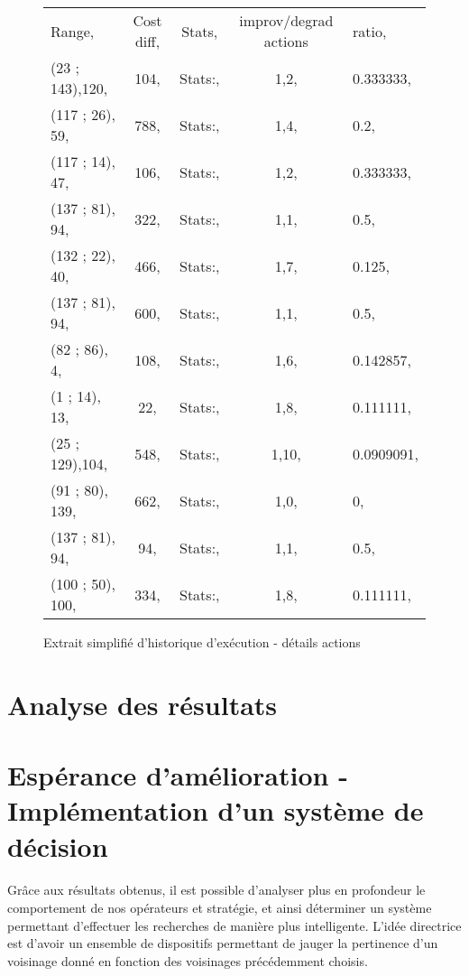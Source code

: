 \documentclass[a4paper,10pt]{report}
\begin{document}
\begin{figure}[h]
  \begin{tabular}{lcccl}
    Range,		&Cost diff,	
				&Stats,	&improv/degrad actions	&ratio,\\
    (23  ; 143),120,	&104,	&Stats:,	&1,2,		&0.333333,\\
    (117 ; 26),  59,	&788,	&Stats:,	&1,4,		&0.2,\\
    (117 ; 14),  47,	&106,	&Stats:,	&1,2,		&0.333333,\\
    (137 ; 81),  94,	&322,	&Stats:,	&1,1,		&0.5,\\
    (132 ; 22),  40,	&466,	&Stats:,	&1,7,		&0.125,\\
    (137 ; 81),  94,	&600,	&Stats:,	&1,1,		&0.5,\\
    (82  ; 86),   4,	&108,	&Stats:,	&1,6,		&0.142857,\\
    (1   ; 14),  13,	&22,	&Stats:,	&1,8,		&0.111111,\\
    (25  ; 129),104,	&548,	&Stats:,	&1,10,		&0.0909091,\\
    (91  ; 80), 139,	&662,	&Stats:,	&1,0,		&0,\\
    (137 ; 81),  94,	&94,	&Stats:,	&1,1,		&0.5,\\
    (100 ; 50), 100,	&334,	&Stats:,	&1,8,		&0.111111,\\
  \end{tabular}
  \label{a280-sample-interval-simple-bis}
  \caption{Extrait simplifié d'historique d'exécution - détails actions}
\end{figure}


\pagebreak
\section{Analyse des résultats}


\section{Espérance d'amélioration - Implémentation d'un système de décision}

\paragraph{}
  Grâce aux résultats obtenus, il est possible d'analyser plus en profondeur le
comportement de nos opérateurs et stratégie, et ainsi déterminer un système
permettant d'effectuer les recherches de manière plus intelligente. L'idée
directrice est d'avoir un ensemble de dispositifs permettant de jauger la
pertinence d'un voisinage donné en fonction des voisinages précédemment choisis.
\end{document}
